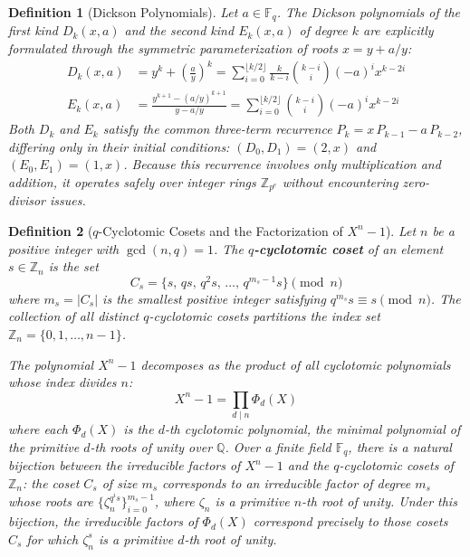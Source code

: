 \documentclass[12pt]{article}
\theoremstyle{plain}
\newtheorem{defn}{Definition}
\begin{document}
\begin{defn}[Dickson Polynomials] \cite{Lidl1993} \label{def:dickson_poly}
Let $a \in \mathbb{F}_q$. The Dickson polynomials of the first kind $D_k(x, a)$ and the second kind $E_k(x, a)$ of degree $k$ are explicitly formulated through the symmetric parameterization of roots $x = y + a/y$:
\begin{align}
    D_k(x, a) &= y^k + \left(\frac{a}{y}\right)^k = \sum_{i=0}^{\lfloor k/2 \rfloor} \frac{k}{k-i} \binom{k-i}{i} (-a)^i x^{k-2i} \\
    E_k(x, a) &= \frac{y^{k+1} - (a/y)^{k+1}}{y - a/y} = \sum_{i=0}^{\lfloor k/2 \rfloor} \binom{k-i}{i} (-a)^i x^{k-2i}
\end{align}
Both $D_k$ and $E_k$ satisfy the common three-term recurrence $P_{k} = x\, P_{k-1} - a\, P_{k-2}$, differing only in their initial conditions: $(D_0, D_1) = (2, x)$ and $(E_0, E_1) = (1, x)$. Because this recurrence involves only multiplication and addition, it operates safely over integer rings $\mathbb{Z}_{p^e}$ without encountering zero-divisor issues.
\end{defn}

\begin{defn}[$q$-Cyclotomic Cosets and the Factorization of $X^n-1$] \cite{MacWilliams1977} \label{def:cyclotomic_cosets}
Let $n$ be a positive integer with $\gcd(n, q) = 1$. The \textbf{$q$-cyclotomic coset} of an element $s \in \mathbb{Z}_n$ is the set
\begin{equation}
    C_s = \{s, \, qs, \, q^2 s, \, \dots, \, q^{m_s - 1} s\} \pmod{n}
\end{equation}
where $m_s = |C_s|$ is the smallest positive integer satisfying $q^{m_s} s \equiv s \pmod{n}$. The collection of all distinct $q$-cyclotomic cosets partitions the index set $\mathbb{Z}_n = \{0, 1, \dots, n-1\}$.

The polynomial $X^n - 1$ decomposes as the product of all cyclotomic polynomials whose index divides $n$:
\begin{equation}
    X^n - 1 = \prod_{d \mid n} \Phi_d(X)
\end{equation}
where each $\Phi_d(X)$ is the $d$-th cyclotomic polynomial, the minimal polynomial of the primitive $d$-th roots of unity over $\mathbb{Q}$. Over a finite field $\mathbb{F}_q$, there is a natural bijection between the irreducible factors of $X^n - 1$ and the $q$-cyclotomic cosets of $\mathbb{Z}_n$: the coset $C_s$ of size $m_s$ corresponds to an irreducible factor of degree $m_s$ whose roots are $\{\zeta_n^{q^i s}\}_{i=0}^{m_s - 1}$, where $\zeta_n$ is a primitive $n$-th root of unity. Under this bijection, the irreducible factors of $\Phi_d(X)$ correspond precisely to those cosets $C_s$ for which $\zeta_n^s$ is a primitive $d$-th root of unity.
\end{defn}
\end{document}
